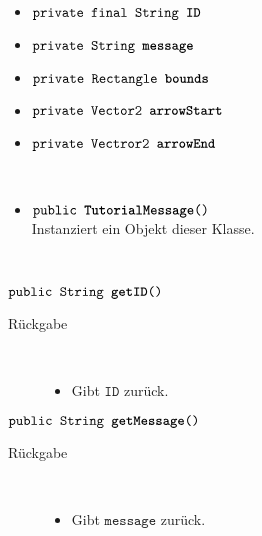 \begin{description}
\item[Beschreibung] \hfill \\ 
\item[Attribute] \hfill \\
	\vspace{-.8cm}
	\begin{itemize}	
		\item $\texttt{private final String \textbf{ID}}$ \\ 		
		\item $\texttt{private String \textbf{message}}$ \\ 
		\item $\texttt{private Rectangle \textbf{bounds}}$ \\ 		
		\item $\texttt{private Vector2 \textbf{arrowStart}}$ \\ 
		\item $\texttt{private Vectror2 \textbf{arrowEnd}}$ \\ 		

		\end{itemize}
	
\item[Konstruktoren] \hfill \\
	\vspace{-.8cm}
	\begin{itemize}
		\item $\texttt{public \textbf{TutorialMessage}()}$ \\ Instanziert ein Objekt dieser Klasse.

	\end{itemize}
	
\item[Methoden] \hfill \\
	\vspace{-.8cm}
		\item $\texttt{public String \textbf{getID}()}$ \\ 
		\begin{description}
			\item[Rückgabe] \hfill \\
			\vspace{-.8cm}
			\begin{itemize}
				\item Gibt $\texttt{ID}$ zurück.
			\end{itemize}
			\end{description}
			
		\item $\texttt{public String \textbf{getMessage}()}$ \\ 
		\begin{description}
			\item[Rückgabe] \hfill \\
			\vspace{-.8cm}
			\begin{itemize}
				\item Gibt $\texttt{message}$ zurück.
			\end{itemize}
			\end{description}


\end{description}
